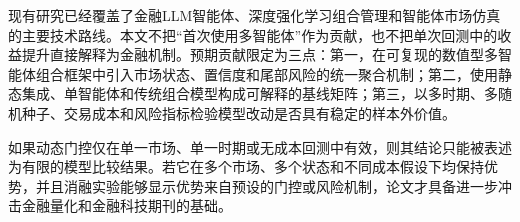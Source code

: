 \documentclass[10.5pt]{article}
\begin{document}
现有研究已经覆盖了金融LLM智能体、深度强化学习组合管理和智能体市场仿真的主要技术路线\citep{DingLiWang2024,XiaYouWang2026}。本文不把“首次使用多智能体”作为贡献，也不把单次回测中的收益提升直接解释为金融机制。预期贡献限定为三点：第一，在可复现的数值型多智能体组合框架中引入市场状态、置信度和尾部风险的统一聚合机制；第二，使用静态集成、单智能体和传统组合模型构成可解释的基线矩阵；第三，以多时期、多随机种子、交易成本和风险指标检验模型改动是否具有稳定的样本外价值。

如果动态门控仅在单一市场、单一时期或无成本回测中有效，则其结论只能被表述为有限的模型比较结果。若它在多个市场、多个状态和不同成本假设下均保持优势，并且消融实验能够显示优势来自预设的门控或风险机制，论文才具备进一步冲击金融量化和金融科技期刊的基础。



\end{document}
